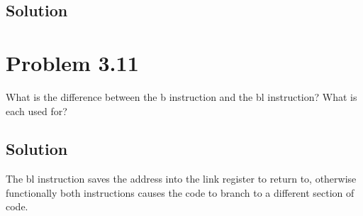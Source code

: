 \documentclass[letterpaper,11pt]{texMemo} %
\begin{document}
\subsection*{Solution}



\newpage
\section*{Problem 3.11}
What is the difference between the b instruction and the bl instruction? What is each used for?
\subsection*{Solution}
The bl instruction saves the address into the link register to return to, otherwise functionally
both instructions causes the code to branch to a different section of code.
\end{document}
